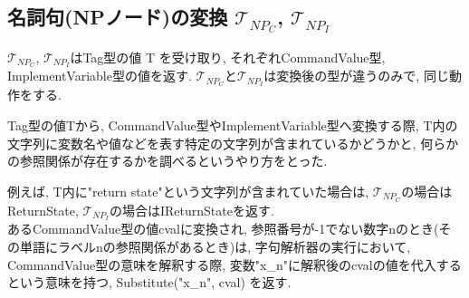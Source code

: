 \documentclass[uplatex,a4j]{jsreport}
\begin{document}
    
\subsection{名詞句(NPノード)の変換 $\mathcal{T}_{NP_C}$, $\mathcal{T}_{NP_I}$}
$\mathcal{T}_{NP_C}$, $\mathcal{T}_{NP_I}$はTag型の値 T を受け取り, それぞれCommandValue型, ImplementVariable型の値を返す. 
$\mathcal{T}_{NP_C}$と$\mathcal{T}_{NP_I}$は変換後の型が違うのみで, 同じ動作をする. 

Tag型の値Tから, CommandValue型やImplementVariable型へ変換する際, 
T内の文字列に変数名や値などを表す特定の文字列が含まれているかどうかと, 何らかの参照関係が存在するかを調べるというやり方をとった. 

例えば, T内に"return state"という文字列が含まれていた場合は, $\mathcal{T}_{NP_C}$の場合はReturnState, $\mathcal{T}_{NP_I}$の場合はIReturnStateを返す. \\

あるCommandValue型の値cvalに変換され, 参照番号が-1でない数字nのとき(その単語にラベルnの参照関係があるとき)は, 
字句解析器の実行において, CommandValue型の意味を解釈する際, 変数"x\_n"に解釈後のcvalの値を代入するという意味を持つ, 
Substitute("x\_n", cval) を返す. \\
\end{document}
